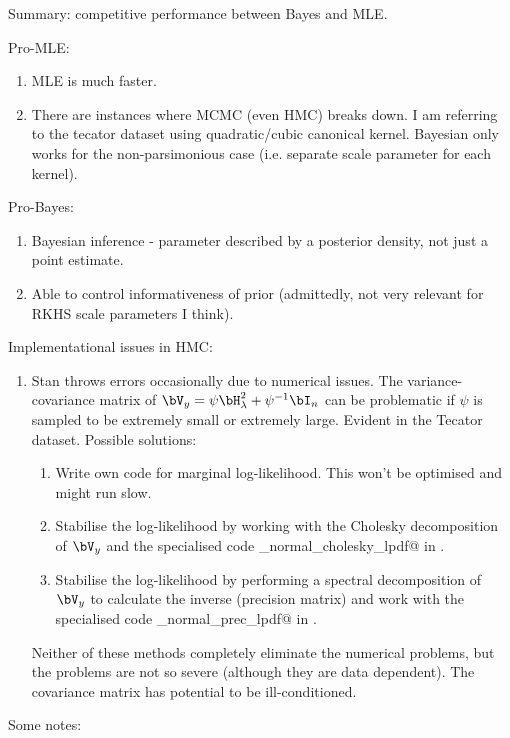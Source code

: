 \documentclass[english, 11pt]{article}
\begin{document}
Summary: competitive performance between Bayes and MLE.

Pro-MLE:

\begin{enumerate}
	\item MLE is much faster.
	\item There are instances where MCMC (even HMC) breaks down. I am referring to the tecator dataset using quadratic/cubic canonical kernel. Bayesian only works for the non-parsimonious case (i.e. separate scale parameter for each kernel).
\end{enumerate}

Pro-Bayes:

\begin{enumerate}
	\item Bayesian inference - parameter described by a posterior density, not just a point estimate.
	\item Able to control informativeness of prior (admittedly, not very relevant for RKHS scale parameters I think).
\end{enumerate}

Implementational issues in HMC:

\begin{enumerate}
	\item Stan throws errors occasionally due to numerical issues. The variance-covariance matrix of $\Vy = \psi \Hlam ^ 2 + \psi^{-1}\bI_n$ can be problematic if $\psi$ is sampled to be extremely small or extremely large. Evident in the Tecator dataset. Possible solutions:
	\begin{enumerate}
		\item Write own code for marginal log-likelihood. This won't be optimised and might run slow.
		\item Stabilise the log-likelihood by working with the Cholesky decomposition of $\Vy$ and the specialised code \verb@multi_normal_cholesky_lpdf@ in .
		\item Stabilise the log-likelihood by performing a spectral decomposition of $\Vy$ to calculate the inverse (precision matrix) and work with the specialised code \verb@multi_normal_prec_lpdf@ in .
	\end{enumerate}
	Neither of these methods completely eliminate the numerical problems, but the problems are not so severe (although they are data dependent). The covariance matrix has potential to be ill-conditioned.
\end{enumerate}

Some notes:
\end{document}
